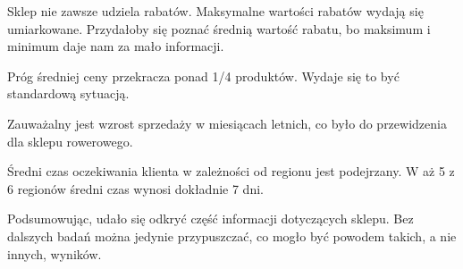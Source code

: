 \documentclass[a4paper,12pt]{article}
\begin{document}
Sklep nie zawsze udziela rabatów. Maksymalne wartości rabatów wydają się umiarkowane. Przydałoby się poznać średnią wartość rabatu, bo maksimum i minimum daje nam za mało informacji.

Próg średniej ceny przekracza ponad 1/4 produktów. Wydaje się to być standardową sytuacją.

Zauważalny jest wzrost sprzedaży w miesiącach letnich, co było do przewidzenia dla sklepu rowerowego.

Średni czas oczekiwania klienta w zależności od regionu jest podejrzany. W aż 5 z 6 regionów średni czas wynosi dokładnie 7 dni.

Podsumowując, udało się odkryć część informacji dotyczących sklepu. Bez dalszych badań można jedynie przypuszczać, co mogło być powodem takich, a nie innych, wyników.
\end{document}
